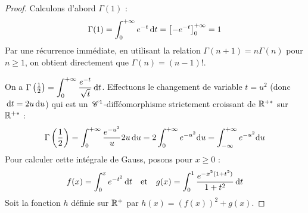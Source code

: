\begin{proof}
    
    \svspace Calculons d'abord $\Gamma(1)$ :
    \[ \Gamma(1) = \int_0^{+\infty} e^{-t} \,\mathrm{d}t = \left[-e^{-t}\right]_0^{+\infty} = 1 \]
    Par une récurrence immédiate, en utilisant la relation $\Gamma(n+1) = n\Gamma(n)$ pour $n \geqslant 1$, on obtient directement que $\Gamma(n) = (n-1)!$.

    
    \lvspace 
    \avspace 
    \svspace On a $\Gamma\left(\frac{1}{2}\right) = \displaystyle\int_0^{+\infty} \frac{e^{-t}}{\sqrt{t}} \,\mathrm{d}t$.
    Effectuons le changement de variable $t = u^2$ (donc $\,\mathrm{d}t = 2u\,\mathrm{d}u$) qui est un $\,\mathscr C^{1}$-difféomorphisme strictement croissant de $\mathbb{R}^{+*}$ sur $\mathbb{R}^{+*}$ :
    \[ \Gamma\left(\frac{1}{2}\right) = \int_0^{+\infty} \frac{e^{-u^2}}{u} 2u\,\mathrm{d}u = 2 \int_0^{+\infty} e^{-u^2} \mathrm{d}u = \int_{-\infty}^{+\infty} e^{-u^2} \mathrm{d}u \]
    Pour calculer cette intégrale de Gauss, posons pour $x \geqslant 0$ :
    \[ f(x) = \int_0^x e^{-t^2} \,\mathrm{d}t \quad \text{et} \quad g(x) = \int_0^1 \frac{e^{-x^2(1+t^2)}}{1+t^2} \,\mathrm{d}t \]
    Soit la fonction $h$ définie sur $\mathbb{R}^+$ par $h(x) = (f(x))^2 + g(x)$.


\end{proof}
